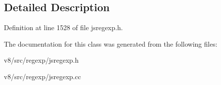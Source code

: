 \subsection{Detailed Description}


Definition at line 1528 of file jsregexp.\+h.



The documentation for this class was generated from the following files\+:\begin{DoxyCompactItemize}
\item 
v8/src/regexp/jsregexp.\+h\item 
v8/src/regexp/jsregexp.\+cc\end{DoxyCompactItemize}

